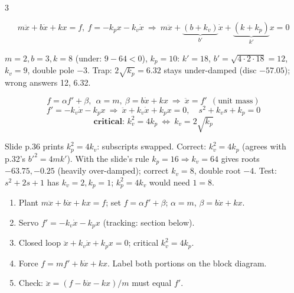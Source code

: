 \begin{multicols}{3}
\columnbreak
{}
\begin{fbx}
\[m\ddot x+b\dot x+kx=f,\ f=-k_px-k_v\dot x\ \Rightarrow\ m\ddot x+\underbrace{(b{+}k_v)}_{b'}\dot x+\underbrace{(k{+}k_p)}_{k'}x=0\]
\end{fbx}
\begin{worked}
$m=2,b=3,k=8$ (under: $9-64<0$), $k_p=10$: $k'=18$, $b'=\sqrt{4\cdot2\cdot18}=12$, $k_v=9$, double pole $-3$. Trap: $2\sqrt{k_p}=6.32$ stays under-damped (disc $-57.05$); wrong answers 12, 6.32. \chk
\end{worked}

\begin{fbx}
\[f=\alpha f'+\beta,\ \ \alpha=m,\ \beta=b\dot x+kx\ \Rightarrow\ \ddot x=f'\ \ (\text{unit mass})\]
\[f'=-k_v\dot x-k_px\ \Rightarrow\ \ddot x+k_v\dot x+k_px=0,\quad s^2+k_vs+k_p=0\]
\[\textbf{critical: } k_v^2=4k_p\ \Longleftrightarrow\ k_v=2\sqrt{k_p}\]
\end{fbx}
\begin{slideerr}
Slide p.36 prints $k_p^2=4k_v$: subscripts swapped. Correct: $k_v^2=4k_p$ (agrees with p.32's $b'^2=4mk'$). With the slide's rule $k_p=16\Rightarrow k_v=64$ gives roots $-63.75,-0.25$ (heavily over-damped); correct $k_v=8$, double root $-4$. Test: $s^2+2s+1$ has $k_v=2,k_p=1$; $k_p^2=4k_v$ would need $1=8$. \chk
\end{slideerr}
\begin{recipe}
\label{w8:part}
\begin{enumerate}
\item Plant $m\ddot x+b\dot x+kx=f$; set $f=\alpha f'+\beta$; $\alpha=m$, $\beta=b\dot x+kx$.
\item Servo $f'=-k_v\dot x-k_px$ (tracking: section below).
\item Closed loop $\ddot x+k_v\dot x+k_px=0$; critical $k_v^2=4k_p$.
\item Force $f=mf'+b\dot x+kx$. Label both portions on the block diagram.
\item Check: $\ddot x=(f-b\dot x-kx)/m$ must equal $f'$.
\end{enumerate}
\end{recipe}

\end{multicols}
